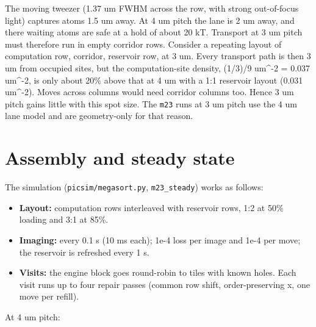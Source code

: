 The moving tweezer (1.37 um FWHM across the row, with strong
out-of-focus light) captures atoms 1.5 um away. At 4 um pitch the lane
is 2 um away, and there waiting atoms are safe at a hold of about 20 kT.
Transport at 3 um pitch must therefore run in empty corridor rows.
Consider a repeating layout of computation row, corridor, reservoir row,
at 3 um. Every transport path is then 3 um from occupied sites, but the
computation-site density, (1/3)/9 um\^{}-2 = 0.037 um\^{}-2, is only
about 20\% above that at 4 um with a 1:1 reservoir layout (0.031
um\^{}-2). Moves across columns would need corridor columns too. Hence 3
um pitch gains little with this spot size. The \texttt{m23} runs at 3 um
pitch use the 4 um lane model and are geometry-only for that reason.

\hypertarget{6-assembly-and-steady-state}{%
\section{Assembly and steady
state}\label{megascale-6-assembly-and-steady-state}}

The simulation (\texttt{picsim/megasort.py}, \texttt{m23\_steady}) works
as follows:

\begin{itemize}
\tightlist
\item
  \textbf{Layout:} computation rows interleaved with reservoir rows, 1:2
  at 50\% loading and 3:1 at 85\%.
\item
  \textbf{Imaging:} every 0.1 s (10 ms each); 1e-4 loss per image and
  1e-4 per move; the reservoir is refreshed every 1 s.
\item
  \textbf{Visits:} the engine block goes round-robin to tiles with known
  holes. Each visit runs up to four repair passes (common row shift,
  order-preserving x, one move per refill).
\end{itemize}

At 4 um pitch:

